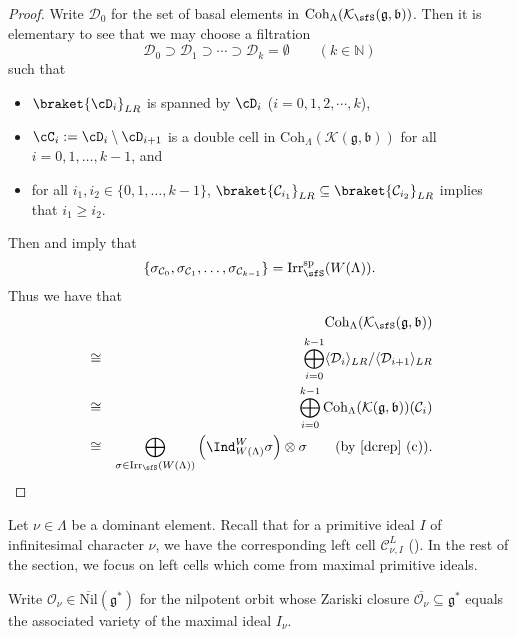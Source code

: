 \documentclass[12pt]{amsart}
\def\subset{\subseteq}
\newcommand{\BN}{{\mathbb {N}}}
\newcommand{\CC}{{\mathcal {C}}}
\newcommand{\CK}{{\mathcal {K}}}
\newcommand{\CO}{{\mathcal {O}}}
\newcommand{\g}{\mathfrak g}
\renewcommand{\b}{\mathfrak b}
\newcommand{\la}{\langle}
\newcommand{\ra}{\rangle}
\numberwithin{equation}{section}
\theoremstyle{remark}
\def\Irr{\mathrm{Irr}}
\def\hha{{}^a\fhh}
\def\Coh{\mathrm{Coh}}
\begin{document}
\begin{proof}
Write $\mathcal D_0$ for the set of basal elements in $ \Coh_{\Lambda}(\CK_\sfS(\g,\b))$.
Then it is elementary to see that we may
 choose a filtration
\[
  \mathcal D_0\supset \mathcal D_1\supset \cdots \supset \mathcal D_k=\emptyset \qquad (k\in \BN)
\]
such that
\begin{itemize}
\item  $\braket{\cD_i}_{LR}$ is spanned by $\cD_i$ ($i=0, 1,2, \cdots ,k$),
\item $\cC_i:=\cD_i\setminus \cD_{i+1}$ is a double cell in $\Coh_{\Lambda}(\CK(\g,\b))$ for all $i=0,1, \dots, k-1$, and
\item
for all $i_1, i_2\in \{0,1, \dots, k-1\}$,
$\braket{\CC_{i_1}}_{LR} \subset \braket{ \CC_{i_2}}_{LR}$ implies that $i_1\geq i_2$.
\end{itemize}

Then  and   imply that
\[
\{\sigma_{\CC_0}, \sigma_{\CC_1}, \dots, \sigma_{\CC_{k-1}}\}= \Irr_\sfS^{\mathrm{sp}}(W(\Lambda)).
\]
Thus we have that
\begin{eqnarray*}
   &&\Coh_{\Lambda}(\CK_\sfS(\g,\b))
\\
   &\cong & \bigoplus_{i=0}^{k-1}  \la \mathcal D_i\ra_{LR}/\la \mathcal D_{i+1}\ra_{LR}\\
    &\cong & \bigoplus_{i=0}^{k-1}  \Coh_{\Lambda}(\CK(\g,\b))(\mathcal C_i)\\
    &\cong &\bigoplus_{\sigma\in \Irr_\sfS(W(\Lambda))} \left(\Ind_{W(\Lambda)}^W\sigma\right)\otimes \sigma\qquad(\textrm{by \Cref{dcrep}~(c)}).
\end{eqnarray*}
\end{proof}



Let $\nu\in \Lambda$ be a dominant element. Recall that for a primitive ideal $I$ of infinitesimal character $\nu$, we have the corresponding left cell $\CC^L_{\nu, I}$ (). In the rest of the section, we focus on left cells which come from maximal primitive ideals.

 Write $\CO_\nu\in \overline{\mathrm{Nil}}(\g^*)$ for the nilpotent orbit
 whose Zariski closure $\overline{\CO_{\nu}}\subset \g^*$ equals
 the associated variety of the maximal ideal $I_\nu$.
\end{document}
